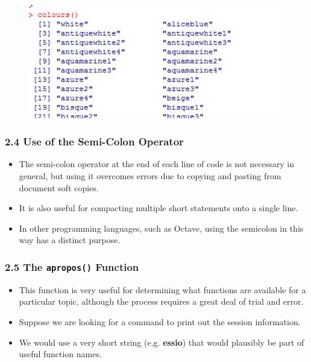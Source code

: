 \documentclass{beamer}
\begin{document}
 	\begin{frame}
 		\begin{figure}
 			\centering
 			\includegraphics[width=1.2\linewidth]{images/Rcolours}
 		\end{figure}
 		
 	\end{frame}
 	\begin{frame}
 		\frametitle{2.4 Use of the Semi-Colon Operator}
 		\begin{itemize}
 			\item The semi-colon operator at the end of each line of code is not necessary in general, but using it
 			overcomes errors due to copying and pasting from document soft copies. 
 			\item It is also useful for compacting multiple short statements onto a single line.
 			\item In other programming
 			languages, such as Octave, using the semicolon in this way has a distinct purpose.
 		\end{itemize}
 	\end{frame}
 	\begin{frame}
 		\frametitle{2.5 The \texttt{apropos()} Function}
 		\begin{itemize}
 		\item This function is very useful for determining what functions are available for a particular topic,
 		although the process requires a great deal of trial and error. 
 		\item Suppose we are looking for a
 		command to print out the session information. 
 		\item We would use a very short string (e.g. \textbf{essio})
 		that would plausibly be part of useful function names.
 		\end{itemize}
 	\end{frame}
 	
\end{document}
